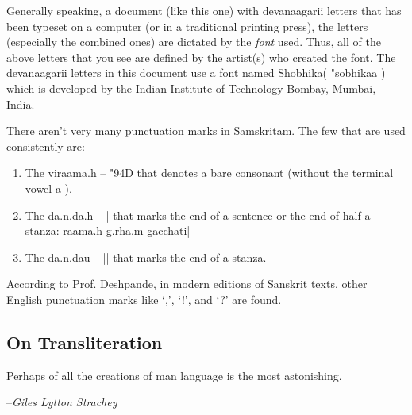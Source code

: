 \documentclass[a4paper, 12pt]{article}
\newcommand \sans[1]{
    \textsanskrit{#1}
}
\begin{document}
Generally speaking, a document (like this one) with \sans{devanaagarii} letters that has been typeset on a computer (or in a traditional printing press), the letters (especially the combined ones) are dictated by the \emph{font} used. Thus, all of the above letters that you see are defined by the artist(s) who created the font. The \sans{devanaagarii} letters in this document use a font named Shobhika(\sans{"sobhikaa}) which is developed by the \href{https://github.com/Sandhi-IITBombay/Shobhika}{Indian Institute of Technology Bombay, Mumbai, India}.

There aren't very many punctuation marks in Samskritam. The few that are used consistently are:
\begin{enumerate}
    \item The \sans{viraama.h -- \char"94D} that denotes a bare consonant (without the terminal vowel \sans{a}).
    \item The \sans{da.n.da.h -- |} that marks the end of a sentence or the end of half a stanza: \sans{raama.h g.rha.m gacchati|}
    \item The \sans{da.n.dau -- ||} that marks the end of a stanza.
\end{enumerate}

According to Prof. Deshpande, in modern editions of Sanskrit texts, other English punctuation marks like `,', `!', and `?' are found.

\subsection{On Transliteration}
\epigraph
{
    Perhaps of all the creations of man language is the most astonishing.
}
{
    --\textit{Giles Lytton Strachey \cite{wap}}
}



\newpage
\appendix
\end{document}
